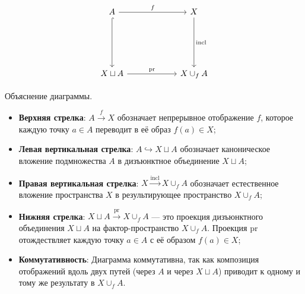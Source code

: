 \begin{center}
    \[
    \begin{tikzcd}[row sep=60pt, column sep=60pt, scale=1]
        A \arrow{r}{f} \arrow[d, hook] & X \arrow{d}{\mathrm{incl}} \\
        X \sqcup A \arrow{r}{\mathrm{pr}} & X \cup_f A
    \end{tikzcd}
    \]
\end{center}
\begin{remark}[Об обозначениях]
	Объяснение диаграммы.
	\begin{itemize}
		\item \textbf{Верхняя стрелка}: $ A \xrightarrow{f} X $ обозначает непрерывное отображение $ f $, которое каждую точку $ a \in A $ переводит в её образ $ f(a) \in X $;
		
		\item \textbf{Левая вертикальная стрелка}: $ A \hookrightarrow X \sqcup A $ обозначает каноническое вложение подмножества $ A $ в дизъюнктное объединение $ X \sqcup A $;
		
		\item \textbf{Правая вертикальная стрелка}: $ X \xrightarrow{\mathrm{incl}} X \cup_f A $ обозначает естественное вложение пространства $ X $ в результирующее пространство $ X \cup_f A $;
		
		\item \textbf{Нижняя стрелка}: $ X \sqcup A \xrightarrow{\mathrm{pr}} X \cup_f A $ — это проекция дизъюнктного объединения $ X \sqcup A $ на фактор-пространство $ X \cup_f A $. Проекция $\mathrm{pr}$ отождествляет каждую точку $ a \in A $ с её образом $ f(a) \in X $;
		
		\item \textbf{Коммутативность}: Диаграмма коммутативна, так как композиция отображений вдоль двух путей (через $ A $ и через $ X \sqcup A $) приводит к одному и тому же результату в $ X \cup_f A $.
	\end{itemize}
\end{remark}

